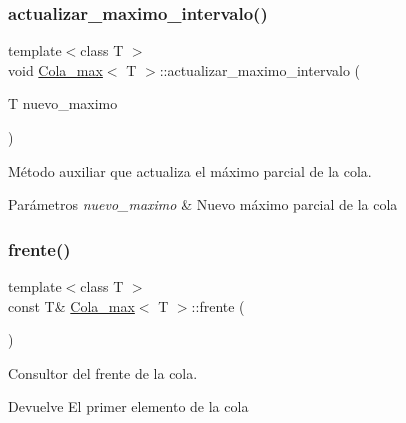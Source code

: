 \subsubsection{\texorpdfstring{actualizar\+\_\+maximo\+\_\+intervalo()}{actualizar\_maximo\_intervalo()}\hspace{0.1cm}{\footnotesize\ttfamily [2/2]}}
{\footnotesize\ttfamily template$<$class T $>$ \\
void \hyperlink{classCola__max}{Cola\+\_\+max}$<$ T $>$\+::actualizar\+\_\+maximo\+\_\+intervalo (\begin{DoxyParamCaption}\item[{T}]{nuevo\+\_\+maximo }\end{DoxyParamCaption})\hspace{0.3cm}{\ttfamily [private]}}



Método auxiliar que actualiza el máximo parcial de la cola. 


\begin{DoxyParams}{Parámetros}
{\em nuevo\+\_\+maximo} & Nuevo máximo parcial de la cola \\
\hline
\end{DoxyParams}
\mbox{\label{classCola__max_a231de7f196376d7f27905b235a45db98}} 
\subsubsection{\texorpdfstring{frente()}{frente()}\hspace{0.1cm}{\footnotesize\ttfamily [1/2]}}
{\footnotesize\ttfamily template$<$class T $>$ \\
const T\& \hyperlink{classCola__max}{Cola\+\_\+max}$<$ T $>$\+::frente (\begin{DoxyParamCaption}{ }\end{DoxyParamCaption})}



Consultor del frente de la cola. 

\begin{DoxyReturn}{Devuelve}
El primer elemento de la cola 
\end{DoxyReturn}
\mbox{\label{classCola__max_a810ac166b15dbd5019109aaf144705e9}} 
